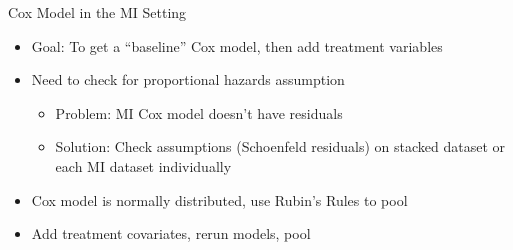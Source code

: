 \begin{frame}{Cox Model in the MI Setting}
\begin{itemize}
 \item Goal: To get a ``baseline'' Cox model, then add treatment variables
 \item Need to check for proportional hazards assumption
 \begin{itemize}
  \item Problem:  MI Cox model doesn't have residuals
  \item Solution: Check assumptions (Schoenfeld residuals) on stacked dataset or each MI dataset individually
 \end{itemize}
\item Cox model is normally distributed, use Rubin's Rules to pool
\item Add treatment covariates, rerun models, pool
\end{itemize}

 
\end{frame}
